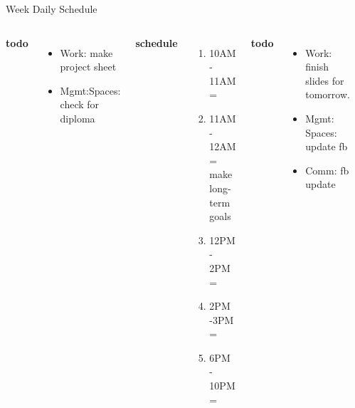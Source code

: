 \begin{frame}
\begin{columns}
\begin{column}{0.50\linewidth}
\begin{block}{Week Daily Schedule}
\begin{columns}
          \textbf{\small todo} \\
          \begin{itemize}
            \tiny \item \tiny Work: make project sheet  
          \item \tiny Mgmt:Spaces: check for diploma  
          \end{itemize}  
          \textbf{\small schedule} 
          \begin{enumerate}
            \tiny \item \tiny 10AM - 11AM = 
          \item \tiny 11AM - 12AM = make long-term goals 
          \item \tiny 12PM - 2PM = 
            \tiny \item \tiny 2PM -3PM = 
          \item \tiny 6PM - 10PM = 
          \end{enumerate}  
          
          \textbf{\small todo} \\
          \begin{itemize}
           \tiny \item \tiny Work: finish slides for tomorrow. 
           \item \tiny Mgmt: Spaces: update fb 
         \item \tiny Comm: fb update 
          \end{itemize}
          \textbf{\small schedule} \\
          \begin{enumerate}
            \tiny \item \tiny 8-9AM: Regular Routines 
          \item \tiny 9AM - 10AM: Send message 
            \item \tiny 6:30PM - 7:30PM = 
          \end{enumerate} 
          \textbf{\small todo}\\
          \begin{itemize}  
            \tiny \item \tiny 
          \item \tiny 
          \end{itemize} 


\end{columns}
\end{block}
\end{column}
\end{columns}
\end{frame}
